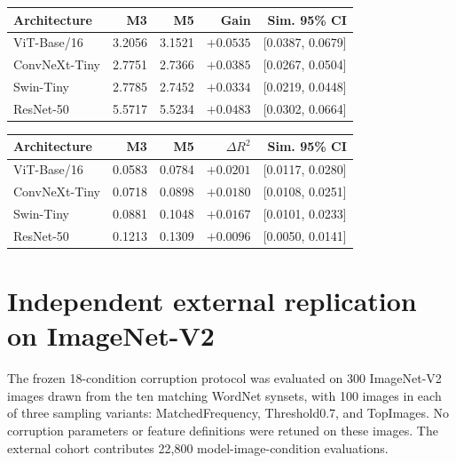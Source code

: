 \documentclass[10pt,twocolumn]{article}
\begin{document}
\begin{table}[t!]
\centering
\begin{minipage}[t]{0.485\textwidth}
\centering
{}
\scriptsize
\setlength{\tabcolsep}{1.8pt}
\renewcommand{\arraystretch}{1.12}
\begin{tabular}{@{}lrrrr@{}}
\toprule
Architecture & M3 & M5 & Gain & Sim. 95\% CI\\
\midrule
ViT-Base/16 & 3.2056 & 3.1521 & $+0.0535$ & [0.0387, 0.0679]\\
ConvNeXt-Tiny & 2.7751 & 2.7366 & $+0.0385$ & [0.0267, 0.0504]\\
Swin-Tiny & 2.7785 & 2.7452 & $+0.0334$ & [0.0219, 0.0448]\\
ResNet-50 & 5.5717 & 5.5234 & $+0.0483$ & [0.0302, 0.0664]\\
\bottomrule
\end{tabular}
\end{minipage}\hfill
\begin{minipage}[t]{0.485\textwidth}
\centering
{}
\scriptsize
\setlength{\tabcolsep}{1.8pt}
\renewcommand{\arraystretch}{1.12}
\begin{tabular}{@{}lrrrr@{}}
\toprule
Architecture & M3 & M5 & $\Delta R^2$ & Sim. 95\% CI\\
\midrule
ViT-Base/16 & 0.0583 & 0.0784 & $+0.0201$ & [0.0117, 0.0280]\\
ConvNeXt-Tiny & 0.0718 & 0.0898 & $+0.0180$ & [0.0108, 0.0251]\\
Swin-Tiny & 0.0881 & 0.1048 & $+0.0167$ & [0.0101, 0.0233]\\
ResNet-50 & 0.1213 & 0.1309 & $+0.0096$ & [0.0050, 0.0141]\\
\bottomrule
\end{tabular}
\end{minipage}
\end{table}
\FloatBarrier

\section{Independent external replication on ImageNet-V2}

The frozen 18-condition corruption protocol was evaluated on 300 ImageNet-V2 images drawn from the ten matching WordNet synsets, with 100 images in each of three sampling variants: MatchedFrequency, Threshold0.7, and TopImages. No corruption parameters or feature definitions were retuned on these images. The external cohort contributes 22,800 model-image-condition evaluations.
\end{document}
